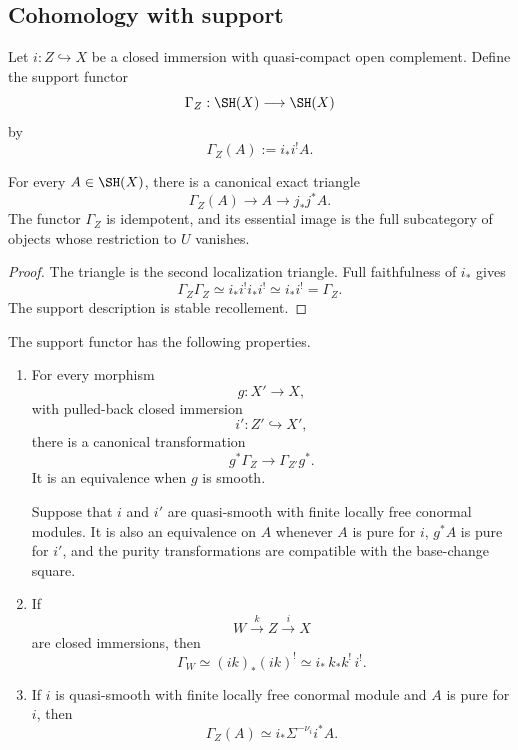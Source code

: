 \subsection{Cohomology with support}

\begin{definition}
\label{def:cohomology-with-support}
Let \(i:Z\hookrightarrow X\) be a closed immersion with quasi-compact open
complement.  Define the support functor
\[
    \Gamma_Z:
    \SH(X)
    \longrightarrow
    \SH(X)
\]
by
\[
    \Gamma_Z(A)
    :=
    i_*i^!A.
\]
\end{definition}

\begin{proposition}
\label{prop:support-triangle}
For every \(A\in\SH(X)\), there is a canonical exact triangle
\[
    \Gamma_Z(A)
    \longrightarrow
    A
    \longrightarrow
    j_*j^*A.
\]
The functor \(\Gamma_Z\) is idempotent, and its essential image is the full
subcategory of objects whose restriction to \(U\) vanishes.
\end{proposition}

\begin{proof}
The triangle is the second localization triangle.  Full faithfulness of
\(i_*\) gives
\[
    \Gamma_Z\Gamma_Z
    \simeq
    i_*i^!i_*i^!
    \simeq
    i_*i^!
    =
    \Gamma_Z.
\]
The support description is stable recollement.
\end{proof}

\begin{proposition}
\label{prop:support-base-change-nested}
The support functor has the following properties.

\begin{enumerate}
    \item For every morphism
    \[
        g:X'\longrightarrow X,
    \]
    with pulled-back closed immersion
    \[
        i':Z'\hookrightarrow X',
    \]
    there is a canonical transformation
    \[
        g^*\Gamma_Z
        \longrightarrow
        \Gamma_{Z'}g^*.
    \]
    It is an equivalence when \(g\) is smooth.

    Suppose that \(i\) and \(i'\) are quasi-smooth with finite locally free
    conormal modules.  It is also an equivalence on \(A\) whenever
    \(A\) is pure for \(i\), \(g^*A\) is pure for \(i'\), and the purity
    transformations are compatible with the base-change square.

    \item If
    \[
        W\xrightarrow{k}Z\xrightarrow{i}X
    \]
    are closed immersions, then
    \[
        \Gamma_W
        \simeq
        (ik)_*(ik)^!
        \simeq
        i_*\,k_*k^!\,i^!.
    \]

    \item If \(i\) is quasi-smooth with finite locally free conormal module
    and \(A\) is pure for \(i\), then
    \[
        \Gamma_Z(A)
        \simeq
        i_*\Sigma^{-\nu_i}i^*A.
    \]
\end{enumerate}
\end{proposition}

